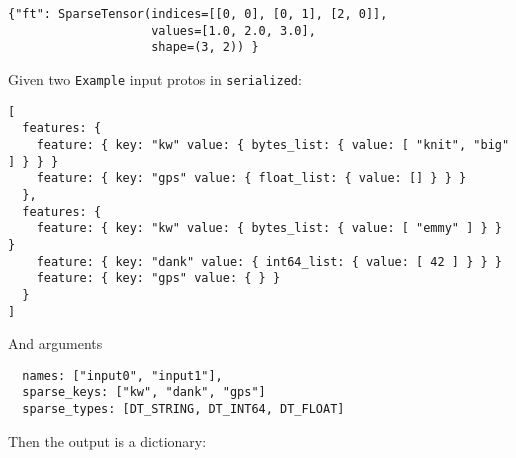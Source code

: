 \begin{verbatim}
{"ft": SparseTensor(indices=[[0, 0], [0, 1], [2, 0]],
                    values=[1.0, 2.0, 3.0],
                    shape=(3, 2)) }
\end{verbatim}

Given two \texttt{Example} input protos in \texttt{serialized}:

\begin{verbatim}
[
  features: {
    feature: { key: "kw" value: { bytes_list: { value: [ "knit", "big" ] } } }
    feature: { key: "gps" value: { float_list: { value: [] } } }
  },
  features: {
    feature: { key: "kw" value: { bytes_list: { value: [ "emmy" ] } } }
    feature: { key: "dank" value: { int64_list: { value: [ 42 ] } } }
    feature: { key: "gps" value: { } }
  }
]
\end{verbatim}

And arguments

\begin{verbatim}
  names: ["input0", "input1"],
  sparse_keys: ["kw", "dank", "gps"]
  sparse_types: [DT_STRING, DT_INT64, DT_FLOAT]
\end{verbatim}

Then the output is a dictionary:

\begin{Shaded}
\begin{Highlighting}[]
\NormalTok{\{}
      \OperatorTok{=}\NormalTok{[[}\NormalTok{, }\NormalTok{], [}\NormalTok{, }\NormalTok{], [}\NormalTok{, }\NormalTok{]],}
      \OperatorTok{=}\NormalTok{[}\NormalTok{, }\NormalTok{, }\NormalTok{]}
      \OperatorTok{=}\NormalTok{[}\NormalTok{, }\NormalTok{]),}
      \OperatorTok{=}\NormalTok{[[}\NormalTok{, }\NormalTok{]],}
      \OperatorTok{=}\NormalTok{[}\NormalTok{],}
      \OperatorTok{=}\NormalTok{[}\NormalTok{, }\NormalTok{]),}
      \OperatorTok{=}\NormalTok{[],}
      \OperatorTok{=}\NormalTok{[],}
      \OperatorTok{=}\NormalTok{[}\NormalTok{, }\NormalTok{]),}
\NormalTok{\}}
\end{Highlighting}
\end{Shaded}

